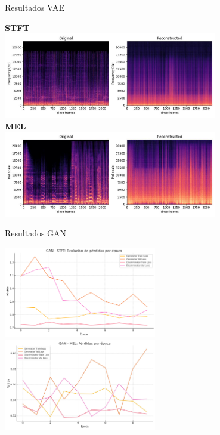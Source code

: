 \documentclass{beamer}
\begin{document}
\begin{frame}{Resultados VAE}
  \vspace{-0.4cm}
  \begin{center}
    \textbf{STFT} \\
    \includegraphics[width=0.7\textwidth]{images/vae_stft_spec_recon.jpg} \\
    \textbf{MEL} \\
    \includegraphics[width=0.7\textwidth]{images/vae_mel_spec_recon.jpg}
  \end{center}
\end{frame}

\begin{frame}{Resultados GAN}
  \begin{center}
    \includegraphics[width=0.5\textwidth]{images/gan_stft_loss_plot.png}
    \includegraphics[width=0.5\textwidth]{images/gan_mel_loss_plot.png}
  \end{center}
\end{frame}
\end{document}
